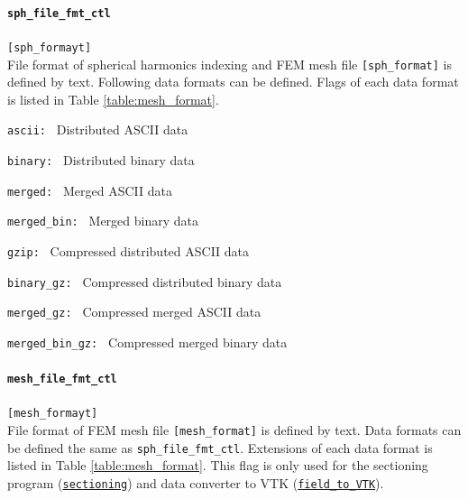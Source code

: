 \paragraph{\tt sph\_file\_fmt\_ctl}
\label{href_t:sph_file_fmt_ctl}
\verb|[sph_formayt]| \\
File format of spherical harmonics indexing and FEM mesh file \verb|[sph_format]| is defined by text. Following data formats can be defined. Flags of each data format is listed in Table \ref{table:mesh_format}.
%
\begin{description}
\item{\tt ascii: }   Distributed ASCII data
\item{\tt binary: }  Distributed binary data
\item{\tt merged: }  Merged ASCII data
\item{\tt merged\_bin: }   Merged binary data
\item{\tt gzip: }            Compressed distributed ASCII data
\item{\tt binary\_gz: }      Compressed distributed binary data
\item{\tt merged\_gz: }      Compressed merged ASCII data
\item{\tt merged\_bin\_gz: } Compressed merged binary data
\end{description}
%

\paragraph{\tt mesh\_file\_fmt\_ctl}
\label{href_t:mesh_file_fmt_ctl}
\verb|[mesh_formayt]| \\
File format of FEM mesh file \verb|[mesh_format]| is defined by text. Data formats can be defined the same as {\tt sph\_file\_fmt\_ctl}. Extensions of each data format is listed in Table \ref{table:mesh_format}. This flag is only used for the sectioning program (\hyperref[sec:sectioning]{\tt sectioning}) and data converter to VTK (\hyperref[sec:field_to_VTK]{\tt field\_to\_VTK}).

